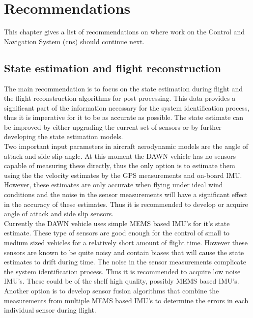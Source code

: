 \chapter{Recommendations}

This chapter gives a list of recommendations on where work on the Control and Navigation System (\gls{cns}) should continue next.

\section{State estimation and flight reconstruction}
The main recommendation is to focus on the state estimation during flight and the flight reconstruction algorithms for post processing. This data provides a significant part of the information necessary for the system identification process, thus it is imperative for it to be as accurate as possible. The state estimate can be improved by either upgrading the current set of sensors or by further developing the state estimation models. \\

Two important input parameters in aircraft aerodynamic models are the angle of attack and side slip angle. At this moment the DAWN vehicle has no sensors capable of measuring these directly, thus the only option is to estimate them using the the velocity estimates by the GPS measurements and on-board IMU. However, these estimates are only accurate when flying under ideal wind conditions and the noise in the sensor measurements will have a significant effect in the accuracy of these estimates.
Thus it is recommended to develop or acquire angle of attack and side slip sensors. \\

Currently the DAWN vehicle uses simple MEMS based IMU's for it's state estimate. These type of sensors are good enough for the control of small to medium sized vehicles for a relatively short amount of flight time. However these sensors are known to be quite noisy and contain biases that will cause the state estimates to drift during time. The noise in the sensor measurements complicate the system identification process. Thus it is recommended to acquire low noise IMU's. These could be of the shelf high quality, possibly MEMS based IMU's. Another option is to develop sensor fusion algorithms that combine the measurements from multiple MEMS based IMU's to determine the errors in each individual sensor during flight.\\

